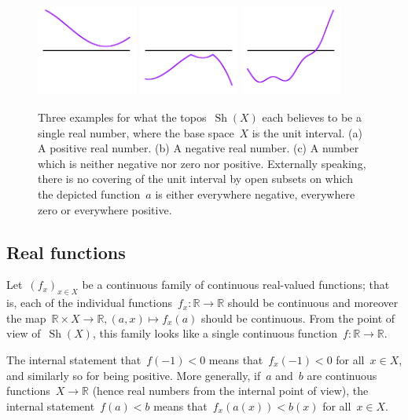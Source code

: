 \documentclass[oneside]{amsart}
\theoremstyle{definition}
\theoremstyle{plain}
\theoremstyle{remark}
\newcommand{\RR}{\mathbb{R}}
\DeclareMathOperator{\Sh}{Sh}
\renewcommand{\_}{\mathpunct{.}\,}
\newcommand{\?}{\,{:}\,}
\begin{document}
\begin{figure}
  \includegraphics[height=3cm]{trichotomy-1}
  \includegraphics[height=3cm]{trichotomy-2}
  \includegraphics[height=3cm]{trichotomy-3}
  \caption{\label{fig:trichotomy} Three examples for what the topos~$\Sh(X)$
  each believes to be a single real number, where the base space~$X$ is the
  unit interval. (a) A positive real number. (b) A negative real number. (c) A
  number which is neither negative nor zero nor positive. Externally speaking,
  there is no covering of the unit interval by open subsets on which the
  depicted function~$a$ is either everywhere negative, everywhere zero or everywhere
  positive.}
\end{figure}


\subsection{Real functions} Let~$(f_x)_{x \in X}$ be a continuous family of
continuous real-valued functions; that is, each of the individual
functions~$f_x : \RR \to \RR$ should be continuous and moreover the map~$\RR
\times X \to \RR, (a,x) \mapsto f_x(a)$ should be continuous.
From the point of view of~$\Sh(X)$, this family looks like a single continuous
function~$f : \RR \to \RR$.

The internal statement that~$f(-1) < 0$ means that~$f_x(-1) < 0$ for all~$x \in
X$, and similarly so for being positive. More generally, if~$a$ and~$b$ are
continuous functions~$X \to \RR$ (hence real numbers from the internal point of
view), the internal statement~$f(a) < b$ means that~$f_x(a(x)) < b(x)$ for
all~$x \in X$.
\end{document}
